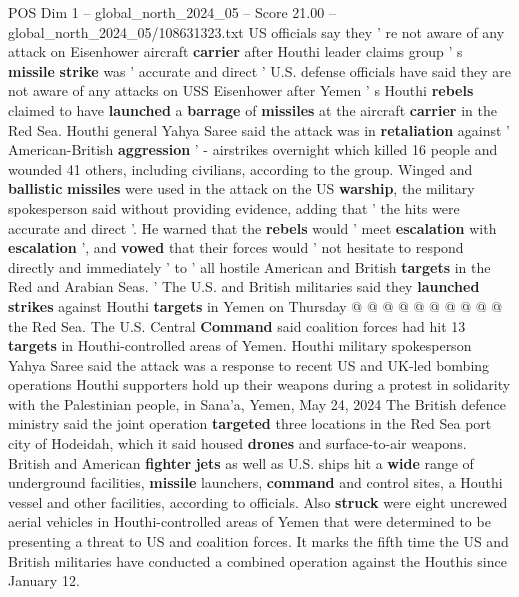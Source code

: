 \begin{textsample}{POS Dim 1 – global\_north\_2024\_05 – Score 21.00 – global\_north\_2024\_05/108631323.txt}  \label{ex:f1_pos_403}
US officials say they ' re not aware of any attack on Eisenhower aircraft \textbf{carrier} after Houthi leader claims group ' s \textbf{missile} \textbf{strike} was ' accurate and direct ' U.S. defense officials have said they are not aware of any attacks on USS Eisenhower after Yemen ' s Houthi \textbf{rebels} claimed to have \textbf{launched} a \textbf{barrage} of \textbf{missiles} at the aircraft \textbf{carrier} in the Red Sea.
Houthi general Yahya Saree said the attack was in \textbf{retaliation} against ' American-British \textbf{aggression} ' - airstrikes overnight which killed 16 people and wounded 41 others, including civilians, according to the group.
Winged and \textbf{ballistic} \textbf{missiles} were used in the attack on the US \textbf{warship}, the military spokesperson said without providing evidence, adding that ' the hits were accurate and direct '.
He warned that the \textbf{rebels} would ' meet \textbf{escalation} with \textbf{escalation} ', and \textbf{vowed} that their forces would ' not hesitate to respond directly and immediately ' to ' all hostile American and British \textbf{targets} in the Red and Arabian Seas. ' The U.S. and British militaries said they \textbf{launched} \textbf{strikes} against Houthi \textbf{targets} in Yemen on Thursday @ @ @ @ @ @ @ @ @ @ the Red Sea.
The U.S.
Central \textbf{Command} said coalition forces had hit 13 \textbf{targets} in Houthi-controlled areas of Yemen.
Houthi military spokesperson Yahya Saree said the attack was a response to recent US and UK-led bombing operations Houthi supporters hold up their weapons during a protest in solidarity with the Palestinian people, in Sana'a, Yemen, May 24, 2024 The British defence ministry said the joint operation \textbf{targeted} three locations in the Red Sea port city of Hodeidah, which it said housed \textbf{drones} and surface-to-air weapons.
British and American \textbf{fighter} \textbf{jets} as well as U.S. ships hit a \textbf{wide} range of underground facilities, \textbf{missile} launchers, \textbf{command} and control sites, a Houthi vessel and other facilities, according to officials.
Also \textbf{struck} were eight uncrewed aerial vehicles in Houthi-controlled areas of Yemen that were determined to be presenting a threat to US and coalition forces.
It marks the fifth time the US and British militaries have conducted a combined operation against the Houthis since January 12.

\end{textsample}
